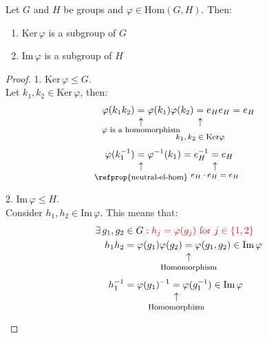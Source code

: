 \documentclass[../main.tex]{subfiles}
\begin{document}
\begin{theorem}
Let $G$ and $H$ be groups and $\varphi\in\text{Hom}(G,H)$. Then:
\begin{enumerate}
    \item {\color{red}$\text{Ker}\,\varphi$ is a subgroup of $G$}
    \item {\color{red}$\text{Im}\,\varphi$ is a subgroup of $H$}
\end{enumerate}
\end{theorem}
\begin{proof}
1. $\text{Ker}\,\varphi\le G$.\\
Let $k_1,k_2\in\text{Ker}\,\varphi$, then: 
\begin{align*}
\varphi(k_1k_2)&\underset{\mathclap{\tikz \node {$\uparrow$} node [below=0.4ex]{\footnotesize $\varphi$ is a homomorphism};}}=\varphi(k_1)\varphi(k_2)\underset{\mathclap{\tikz \node {$\uparrow$} node [below=2.1ex] {\footnotesize $k_1,k_2\in\text{Ker}\varphi$ };}}=e_H e_H=e_H\\
\varphi(k_1^{-1})&\underset{\mathclap{\tikz \node {$\uparrow$} node [below=1ex]{\footnotesize \refprop{neutral-el-hom} };}}=\varphi^{-1}(k_1)=e_H^{-1}\underset{\mathclap{\tikz \node {$\uparrow$} node [below=1ex]{\footnotesize $e_H\cdot e_H=e_H$ };}}=e_H
\end{align*}
2. Im\,$\varphi\le H$.\\
Consider $h_1,h_2\in\text{Im}\,\varphi$. This means that:
\begin{align*}
    \exists\, g_1,g_2&\in G: {\color{red}h_j=\varphi(g_j) \text{ for } j\in\{1,2\}}\\
    h_1 h_2&=\varphi(g_1)\varphi(g_2)\underset{\mathclap{\tikz \node {$\uparrow$} node [below=1ex]{\footnotesize Homomorphism };}}=\varphi(g_1,g_2)\in\text{Im}\,\varphi\\
    h_1^{-1}&=\varphi(g_1)^{-1}\underset{\mathclap{\tikz \node {$\uparrow$} node [below=1ex]{\footnotesize Homomorphism };}}=\varphi(g_1^{-1})\in\text{Im}\,\varphi
\end{align*}
\end{proof}
\end{document}
